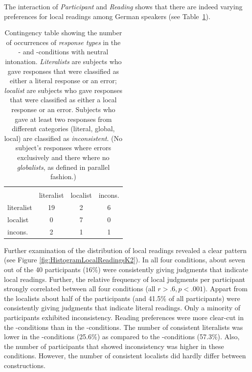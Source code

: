\documentclass[fleqn,reqno,10pt,draft]{article}
\newcommand{\as}{\acro{as}}
\renewcommand{\es}{\acro{es}}
\begin{document}
The interaction of {\it Participant} and {\it Reading} shows that
there are indeed varying preferences for local readings among German
speakers (see Table~\ref{table:answer-types-as}).
%
\begin{table}[t]
  \centering
      \begin{tabular}{lccc}
      & \multicolumn{3}{c}{\es} \\ \cmidrule(r){2-4}
      \as & literalist & localist & incons. \\ \midrule
      literalist   & 19 & 2 & 6\\
      localist     &  0 & 7 & 0 \\
      incons. &  2 & 1 & 1\\
    \end{tabular}
    \caption{Contingency table showing the number of occurrences of
      \emph{response types} in the \as- and \es-conditions with
      neutral intonation. \emph{Literalists} are subjects who gave
      responses that were classified as either a literal response or
      an error; \emph{localist} are subjects who gave responses
      that were classified as either a 
      local response or an error. Subjects who gave at least two
      responses from different categories (literal, global, local) are
      classified as \emph{inconsistent}. (No subject's responses where
      errors exclusively and there where no \emph{globalists}, as
      defined in parallel fashion.)}
    \label{table:answer-types-as}
\end{table}
%
Further examination of the distribution of local readings revealed a
clear pattern (see Figure \ref{fig:HistogramLocalReadingsK2}). In all
four conditions, about seven out of the 40 participants ($16\%$) were
consistently giving judgments that indicate local readings. Further, the relative frequency of local judgments per
participant strongly correlated between all four conditions (all
$r>.6, p<.001$). Appart from the localists about half of the
participants (and 41.5\% of all participants) were consistently giving
judgments that indicate literal readings. Only a minority of
participants exhibited inconsistency. Reading preferences were more
clear-cut in the \as-conditions than in the \es-conditions. The number
of consistent literalists was lower in the \es-conditions (25.6\%) as
compared to the \as-conditions (57.3\%). Also, the number of
participants that showed inconsistency was higher in these
conditions. However, the number of consistent localists did hardly
differ between constructions.
\end{document}
